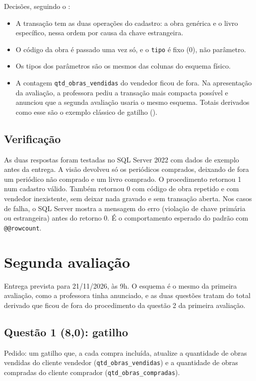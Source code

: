Decisões, seguindo o :

\begin{itemize}
	\item A transação tem as duas operações do cadastro: a obra genérica e
	o livro específico, nessa ordem por causa da chave estrangeira.
	\item O código da obra é passado uma vez só, e o \texttt{tipo} é fixo
	(0), não parâmetro.
	\item Os tipos dos parâmetros são os mesmos das colunas do esquema
	físico.
	\item A contagem \texttt{qtd\_obras\_vendidas} do vendedor ficou de
	fora. Na apresentação da avaliação, a professora pediu a transação
	mais compacta possível e anunciou que a segunda avaliação usaria o
	mesmo esquema. Totais derivados como esse são o exemplo clássico de
	gatilho ().
\end{itemize}

\subsection{Verificação}

As duas respostas foram testadas no SQL Server 2022 com dados de exemplo
antes da entrega. A visão devolveu só os periódicos comprados, deixando
de fora um periódico não comprado e um livro comprado. O procedimento
retornou 1 num cadastro válido. Também retornou 0 com código de obra
repetido e com vendedor inexistente, sem deixar nada gravado e sem
transação aberta. Nos casos de falha, o SQL Server mostra a mensagem do
erro (violação de chave primária ou estrangeira) antes do retorno 0. É o
comportamento esperado do padrão com \texttt{@@rowcount}.

\section{Segunda avaliação}

Entrega prevista para 21/11/2026, às 9h. O esquema é o mesmo da primeira
avaliação, como a professora tinha anunciado, e as duas questões tratam
do total derivado que ficou de fora do procedimento da questão 2 da
primeira avaliação.

\subsection{Questão 1 (8,0): gatilho}

Pedido: um gatilho que, a cada compra incluída, atualize a quantidade de
obras vendidas do cliente vendedor (\texttt{qtd\_obras\_vendidas}) e a
quantidade de obras compradas do cliente comprador
(\texttt{qtd\_obras\_compradas}).

